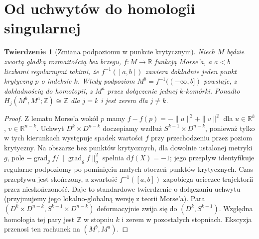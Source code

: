 \documentclass[11pt,a4paper,oneside]{report}
\newcommand{\R}{\mathbb{R}}
\newcommand{\Z}{\mathbb{Z}}
\newcommand{\dd}{\mathrm d}
\theoremstyle{plain}
\newtheorem{twierdzenie}{Twierdzenie}[section]
\theoremstyle{definition}
\theoremstyle{remark}
\begin{document}
\section{Od uchwytów do homologii singularnej}
\begin{twierdzenie}[Zmiana podpoziomu w punkcie krytycznym]
\label{thm:morse-handle-v10}
Niech $M$ będzie zwartą gładką rozmaitością bez brzegu,
$f:M\to\R$ funkcją Morse'a, a $a<b$ liczbami regularnymi
takimi, że $f^{-1}([a,b])$ zawiera dokładnie jeden punkt
krytyczny $p$ o indeksie $k$.
Wtedy podpoziom $M^b=f^{-1}(( -\infty,b])$ powstaje,
z dokładnością do homotopii, z $M^a$ przez dołączenie
jednej $k$-komórki. Ponadto
$H_j(M^b,M^a;\Z)\cong\Z$ dla $j=k$ i jest zerem
dla $j\ne k$.
\end{twierdzenie}
\begin{proof}
Z lematu Morse'a wokół $p$ mamy $f-f(p)=-\|u\|^2+\|v\|^2$
dla $u\in\R^k$, $v\in\R^{n-k}$. Uchwyt
$D^k\times D^{n-k}$ doczepiamy wzdłuż
$S^{k-1}\times D^{n-k}$, ponieważ tylko w tych kierunkach
występuje spadek wartości $f$ przy przechodzeniu
przez poziom krytyczny. Na obszarze bez punktów krytycznych, dla dowolnie ustalonej
metryki $g$, pole $-\operatorname{grad}_g f/\|\operatorname{grad}_g f\|_g^2$
spełnia $\dd f(X)=-1$; jego przepływ identyfikuje regularne
podpoziomy po pominięciu małych otoczeń punktów krytycznych.
Czas przepływu jest skończony, a zwartość $f^{-1}([a,b])$
zapobiega ucieczce trajektorii przez nieskończoność.
Daje to standardowe twierdzenie o dołączaniu uchwytu
(przyjmujemy jego lokalno-globalną wersję z teorii Morse'a).
Para $(D^k\times D^{n-k},S^{k-1}\times D^{n-k})$
deformacyjnie zwija się do $(D^k,S^{k-1})$.
Względna homologia tej pary jest $\Z$ w stopniu $k$
i zerem w pozostałych stopniach. Ekscyzja przenosi
ten rachunek na $(M^b,M^a)$.
\end{proof}
\end{document}
